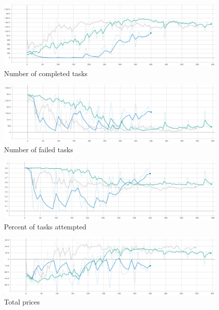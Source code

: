 \begin{figure}[h]
    \centering
    \includegraphics[width=15cm]{figures/env_training_fig/num_completed_tasks.PNG}
    \caption{Number of completed tasks}
    \label{fig:env_num_completed_tasks}
\end{figure}

\begin{figure}[h]
    \centering
    \includegraphics[width=15cm]{figures/env_training_fig/num_failed_tasks.png}
    \caption{Number of failed tasks}
    \label{fig:env_num_failed_tasks}
\end{figure}

\begin{figure}[h]
    \centering
    \includegraphics[width=15cm]{figures/env_training_fig/percent_tasks.png}
    \caption{Percent of tasks attempted}
    \label{fig:env_percent_tasks}
\end{figure}

\begin{figure}[h]
    \centering
    \includegraphics[width=15cm]{figures/env_training_fig/total_prices.png}
    \caption{Total prices}
    \label{fig:env_total_prices}
\end{figure}


